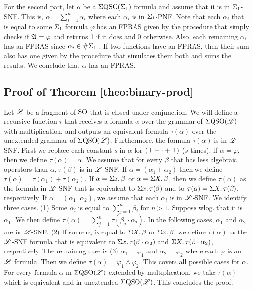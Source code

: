 \vspace{1em}
For the second part, let $\alpha$ be a $\Sigma{\rm QSO}(\Sigma_{1})$ formula and assume that it is in $\Sigma_{1}$-SNF. This is, $\alpha = \sum_{i = 1}^n\alpha_i$ where each $\alpha_i$ is in $\Sigma_{1}$-PNF. Note that each $\alpha_i$ that is equal to some $\Sigma_{1}$ formula $\varphi$ has an FPRAS given by the procedure that simply checks if $\mathfrak{A}\models\varphi$ and returns 1 if it does and 0 otherwise. Also, each remaining $\alpha_i$ has an FPRAS since $\alpha_i\in \#\Sigma_{1}$ \cite{SalujaST95}. If two functions have an FPRAS, then their sum also has one given by the procedure that simulates them both and sums the results. We conclude that $\alpha$ has an FPRAS.










\subsection*{Proof of Theorem \ref{theo:binary-prod}}

Let $\mathscr{L}$ be a fragment of ${\rm SO}$ that is closed under conjunction. We will define a recursive function $\tau$ that receives a formula $\alpha$ over the grammar of $\Sigma{\rm QSO}(\mathscr{L})$ with multiplication, and outputs an equivalent formula $\tau(\alpha)$ over the unextended grammar of $\Sigma{\rm QSO}(\mathscr{L})$. Furthermore, the formula $\tau(\alpha)$ is in $\mathscr{L}$-SNF. First we replace each constant $s$ in $\alpha$ for $(\top + \cdot + \top)$ ($s$ times). If $\alpha = \varphi$, then we define $\tau(\alpha) = \alpha$. We assume that for every $\beta$ that has less algebraic operators than $\alpha$, $\tau(\beta)$ is in $\mathscr{L}$-SNF. If $\alpha = (\alpha_1 + \alpha_2)$ then we define $\tau(\alpha) = \tau(\alpha_1) + \tau(\alpha_2)$. If $\alpha = \Sigma{x}.\,\beta$ or $\alpha = \Sigma{X}.\,\beta$, then we define $\tau(\alpha)$ as the formula in $\mathscr{L}$-SNF that is equivalent to $\Sigma{x}.\,\tau(\beta)$ and to $\tau(\alpha) = \Sigma{X}.\,\tau(\beta)$, respectively. If $\alpha = (\alpha_1 \cdot \alpha_2)$, we assume that each $\alpha_i$ is in $\mathscr{L}$-SNF. We identify three cases. (1) Some $\alpha_i$ is equal to $\sum_{j = 1}^n\beta_j$ for $n > 1$. Suppose wlog. that it is $\alpha_1$. We then define $\tau(\alpha) = \sum_{j = 1}^n\tau(\beta_j\cdot\alpha_2)$. In the following cases, $\alpha_1$ and $\alpha_2$ are in $\mathscr{L}$-SNF. (2) If some $\alpha_i$ is equal to $\Sigma{X}.\,\beta$ or $\Sigma{x}.\,\beta$, we define $\tau(\alpha)$ as the $\mathscr{L}$-SNF formula that is equivalent to $\Sigma{x}.\,\tau(\beta\cdot\alpha_2)$ and $\Sigma{X}.\,\tau(\beta\cdot\alpha_2)$, respectively. The remaining case is (3) $\alpha_1 = \varphi_1$ and $\alpha_2 = \varphi_2$ where each $\varphi$ is an $\mathscr{L}$ formula. Then we define $\tau(\alpha) = \varphi_1 \wedge \varphi_2$. This covers all possible cases for $\alpha$. For every formula $\alpha$ in $\Sigma{\rm QSO}(\mathscr{L})$ extended by multiplication, we take $\tau(\alpha)$ which is equivalent and in unextended $\Sigma{\rm QSO}(\mathscr{L})$. This concludes the proof.










